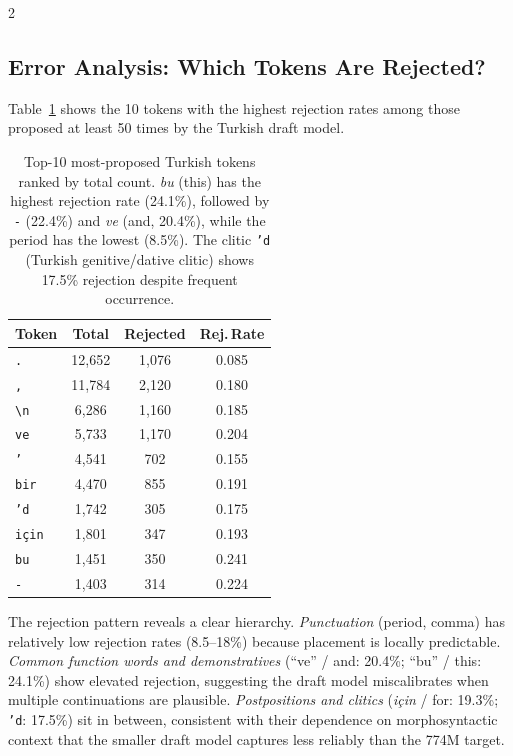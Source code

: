 \documentclass[11pt,a4paper]{article}
\begin{document}
\begin{multicols}{2}
\subsection{Error Analysis: Which Tokens Are Rejected?}
\label{sec:error}

Table~\ref{tab:rejected} shows the 10 tokens with the highest rejection
rates among those proposed at least 50 times by the Turkish draft model.

\begin{table}[t]
\centering
\small
\begin{tabular}{lccc}
\toprule
\textbf{Token} & \textbf{Total} & \textbf{Rejected} & \textbf{Rej.\,Rate} \\
\midrule
\texttt{.}          & 12{,}652 & 1{,}076 & 0.085 \\
\texttt{,}          & 11{,}784 & 2{,}120 & 0.180 \\
\texttt{\textbackslash{}n} &  6{,}286 & 1{,}160 & 0.185 \\
\texttt{ve}         &  5{,}733 & 1{,}170 & 0.204 \\
\texttt{'}          &  4{,}541 &   702  & 0.155 \\
\texttt{bir}        &  4{,}470 &   855  & 0.191 \\
\texttt{'d}         &  1{,}742 &   305  & 0.175 \\
\texttt{için}       &  1{,}801 &   347  & 0.193 \\
\texttt{bu}         &  1{,}451 &   350  & 0.241 \\
\texttt{-}          &  1{,}403 &   314  & 0.224 \\
\bottomrule
\end{tabular}
\caption{Top-10 most-proposed Turkish tokens ranked by total count.
\textit{bu} (this) has the highest rejection rate (24.1\%),
followed by \texttt{-} (22.4\%) and \textit{ve} (and, 20.4\%),
while the period has the lowest (8.5\%).
The clitic \texttt{'d} (Turkish genitive/dative clitic) shows
17.5\% rejection despite frequent occurrence.}
\label{tab:rejected}
\end{table}

The rejection pattern reveals a clear hierarchy.
\textit{Punctuation} (period, comma) has relatively low rejection rates
(8.5--18\%) because placement is locally predictable.
\textit{Common function words and demonstratives} (``ve'' / and:
20.4\%; ``bu'' / this: 24.1\%) show elevated rejection, suggesting
the draft model miscalibrates when multiple continuations are plausible.
\textit{Postpositions and clitics} (\textit{için} / for: 19.3\%;
\texttt{'d}: 17.5\%) sit in between, consistent with their dependence
on morphosyntactic context that the smaller draft model captures
less reliably than the 774M target.


\end{multicols}
\end{document}
